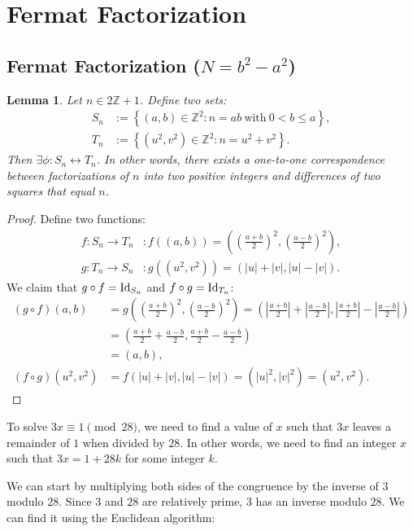 \documentclass[12pt,openany]{book}
\newtheorem{lemma}[theorem]{Lemma}
\theoremstyle{definition}
\newcommand{\set}[1]{\left\{#1\right\}}
\newcommand{\Z}{\mathbb{Z}}
\newcommand{\of}[1]{\left( #1 \right)}
\newcommand{\abs}[1]{\left\lvert #1 \right\rvert}
\newcommand{\id}{\operatorname{\textnormal{Id}}}
\begin{document}
	\newpage
	\section{Fermat Factorization}
	\subsection{Fermat Factorization ($N=b^2-a^2$)}
	\begin{tcolorbox}[colback=white,colframe=lemcolor,arc=5pt,title={\color{white}\bf }]
		\begin{lemma}
			Let $n\in 2\Z+1$. Define two sets: \begin{align*}
			S_n&:=\set{(a,b)\in\Z^2:n=ab\ \text{with}\ 0<b\leq a},\\
			T_n&:=\set{\of{u^2,v^2}\in\Z^2:n=u^2+v^2}.
			\end{align*} Then $\exists\phi:S_n\leftrightarrow T_n$. In other words, there exists a one-to-one correspondence between factorizations of $n$ into two positive integers and differences of two squares that equal $n$.
		\end{lemma}
	\end{tcolorbox}
	\begin{proof}
		Define two functions: \begin{align*}
		f:S_n\to T_n&:f\of{\of{a,b}}=\of{\of{\frac{a+b}{2}}^2,\of{\frac{a-b}{2}}^2},\\
		g:T_n\to S_n&:g\of{\of{u^2,v^2}}=\of{\abs{u}+\abs{v},\abs{u}-\abs{v}}.
		\end{align*} We claim that $g\circ f=\id_{S_n}$ and $f\circ g=\id_{T_n}$:\begin{align*}
		\of{g\circ f}(a,b)&=g\of{\of{\frac{a+b}{2}}^2,\of{\frac{a-b}{2}}^2}=\of{\abs{\frac{a+b}{2}}+\abs{\frac{a-b}{2}},\abs{\frac{a+b}{2}}-\abs{\frac{a-b}{2}}}\\
		&=\of{{\frac{a+b}{2}}+{\frac{a-b}{2}},{\frac{a+b}{2}}-{\frac{a-b}{2}}}\\
		&=\of{a,b},\\
		\of{f\circ g}\of{u^2,v^2}&=f\of{\abs{u}+\abs{v},\abs{u}-\abs{v}}=\of{\abs{u}^2,\abs{v}^2}=\of{u^2,v^2}.
		\end{align*}
	\end{proof}
	
	To solve $3x\equiv 1\pmod{28}$, we need to find a value of $x$ such that $3x$ leaves a remainder of $1$ when divided by $28$. In other words, we need to find an integer $x$ such that $3x = 1 + 28k$ for some integer $k$.
	
	We can start by multiplying both sides of the congruence by the inverse of $3$ modulo $28$. Since $3$ and $28$ are relatively prime, $3$ has an inverse modulo $28$. We can find it using the Euclidean algorithm:
	
\end{document}
